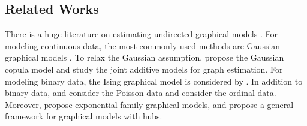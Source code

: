 \documentclass[twoside,11pt]{article}
\begin{document}
\subsection{Related Works}

There is a huge literature on estimating undirected graphical models
\citep{lauritzen1996graphical,edwards2000introduction,whittaker2009graphical}.  %
For modeling continuous data, the most commonly used methods are Gaussian graphical models  \citep{yuan2007model,banerjee2008model,friedman2008sparse,ravikumar2011high,rothman2008sparse,lam2009sparsistency,shen2012likelihood,yuan2010high,cai2011constrained,sun2013sparse,guo2011joint,danaher2014joint,mohan2014node,meinshausen2006high,peng2009partial,friedman2010applications}. To relax the Gaussian assumption, \cite{liu2009nonparanormal,xue2012regularized,liu2012high,ning2013high} propose the Gaussian copula model and \cite{voorman2014graph} study the joint additive models for graph estimation. For modeling binary data, the Ising graphical model is considered by  \cite{lee2006efficient,hofling2009estimation,ravikumar2010high,xue2012nonconcave,cheng2012sparse}. In addition to binary data, \cite{allen2012log} and \cite{ yang2013poisson} consider the Poisson data and \cite{guo2014graphical} consider the ordinal data. Moreover, \cite{yang2013graphical} propose exponential family graphical models, and \cite{tan2014learning} propose a general framework for graphical models with hubs. 
\end{document}
